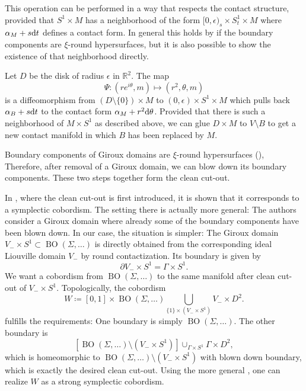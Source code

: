 This operation can be performed in a way that respects the contact structure,
provided that $S^1 \times M$ has a neighborhood
of the form $[0, \epsilon)_s \times S^1_t \times M$ where $\alpha_M + s \mathrm{d} t$
defines a contact form.
In general this holds by \cite[Lemma 5.1]{MNW13} if the boundary components 
are $\xi$-round hypersurfaces, but it is also possible to show the existence 
of that neighborhood directly.

Let $D$ be the disk of radius $\epsilon$ in $\mathbb R^2$. The map 
\[
    \Psi \colon (re^{i\theta} , m) \mapsto (r^2, \theta, m)
\]
is a diffeomorphism from $(D \setminus \{0\}) \times M$ to 
$(0, \epsilon) \times S^1 \times M$ which pulls back $\alpha_B + s \mathrm{d} t$ 
to the contact form $\alpha_M + r^2 \mathrm{d}\theta$. 
Provided that there is such a neighborhood of $M \times S^1$ as described above, 
we can glue $D \times M$ to $V \setminus B$ to get a new contact manifold 
in which $B$ has been replaced by $M$.

Boundary components of Giroux domains are 
$\xi$-round hypersurfaces (\cite[Section 5.3]{MNW13}),
Therefore, after removal of a Giroux domain, we can blow down
its boundary components.
These two steps together form the clean cut-out.

In \cite[Section 6]{MNW13}, where the clean cut-out is first introduced,
it is shown that it corresponds to a symplectic cobordism.
The setting there is actually more general: The authors consider a Giroux
domain where already some of the boundary components have been blown down.
In our case, the situation is simpler: The Giroux domain 
$V_- \times S^1 \subset \operatorname{BO}(\Sigma, \dots)$
is directly obtained from the corresponding ideal Liouville domain $V_-$ by 
round contactization.
Its boundary is given by 
\[
    \partial V_- \times S^1 = \Gamma \times S^1.
\]
We want a cobordism from $\operatorname{BO}(\Sigma, \dots)$ to
the same manifold after clean cut-out of $V_- \times S^1$.
Topologically, the cobordism
\[
    W \coloneqq [0,1] \times \operatorname{BO}(\Sigma, \dots) \bigcup_{\{1\} \times \left(V_- \times S^1\right)} V_- \times D^2.
\]
fulfills the requirements: One boundary is simply 
$\operatorname{BO}(\Sigma, \dots)$.
The other boundary is 
\[
    \left[\operatorname{BO}(\Sigma, \dots) \setminus \left(V_- \times S^1\right)\right] 
    \cup_{\Gamma \times S^1} \Gamma \times D^2,
\]
which is homeomorphic to 
$\operatorname{BO}(\Sigma, \dots) \setminus \left(V_- \times S^1\right)$
with blown down boundary, which is exactly the desired clean cut-out.
Using the more general \cite[Theorem 6.1]{MNW13}, one can realize 
$W$ as a strong symplectic cobordism.

